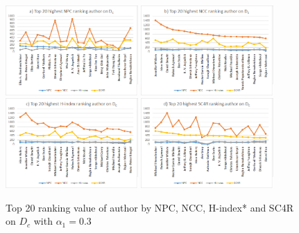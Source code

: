\documentclass[10pt,leqno,twoside]{article}
\begin{document}
\begin{figure} %
	\caption{Top 20 ranking value of author by NPC, NCC, H-index* and SC4R on $D_c$ with $\alpha_1=0.3$}
	\label{Fig:Top20AuthorDc}
    \centering
    \includegraphics[width=0.45\textwidth]{DCt20NPCa}
    \includegraphics[width=0.45\textwidth]{DCt20NCCa}
    \includegraphics[width=0.45\textwidth]{DCt20Hindexa}
    \includegraphics[width=0.45\textwidth]{DCt20SC4Ra}
\end{figure}
\end{document}
